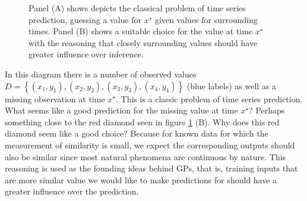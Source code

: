 \begin{figure}[h]
{\begin{adjustbox}{width=0.48\textwidth}
        \end{adjustbox}
    }
    \caption{Panel (A) shows depicts the classical problem of time series prediction, guessing a value for $x^{\star}$ given values for surrounding times. Panel (B) shows a suitable choice for the value at time $x^{\star}$ with the reasoning that closely surrounding values should have greater influence over inference.}
    \label{fig: motive_gp_1}
\end{figure}

In this diagram there is a number of observed values $D = \left\{ (x_1,y_1), (x_2,y_2), (x_3,y_3), (x_4,y_4) \right\}$ (blue labels) as well as a missing observation at time $x^{\star}$. This is a classic problem of time series prediction. What seems like a good prediction for the missing value at time $x^{\star}$? Perhaps something close to the red diamond seen in figure \ref{fig: motive_gp_1} (B). Why does this red diamond seem like a good choice? Because for known data for which the measurement of similarity is small, we expect the corresponding outputs should also be similar since most natural phenomena are continuous by nature. This reasoning is used as the founding ideas behind GPs, that is, training inputs that are more similar value we would like to make predictions for should have a greater influence over the prediction.

